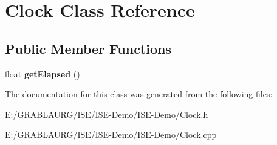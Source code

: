 \hypertarget{class_clock}{\section{Clock Class Reference}
\label{class_clock}
}
\subsection*{Public Member Functions}
\begin{DoxyCompactItemize}
\item 
\hypertarget{class_clock_a2787f0e91b0dbc751d8f91d7528eda87}{float {\bfseries get\-Elapsed} ()}\label{class_clock_a2787f0e91b0dbc751d8f91d7528eda87}

\end{DoxyCompactItemize}


The documentation for this class was generated from the following files\-:\begin{DoxyCompactItemize}
\item 
E\-:/\-G\-R\-A\-B\-L\-A\-U\-R\-G/\-I\-S\-E/\-I\-S\-E-\/\-Demo/\-I\-S\-E-\/\-Demo/Clock.\-h\item 
E\-:/\-G\-R\-A\-B\-L\-A\-U\-R\-G/\-I\-S\-E/\-I\-S\-E-\/\-Demo/\-I\-S\-E-\/\-Demo/Clock.\-cpp\end{DoxyCompactItemize}
